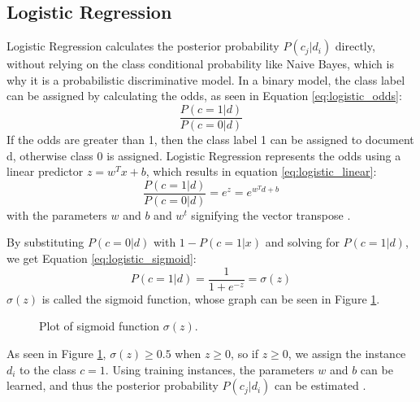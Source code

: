 \subsection{Logistic Regression}
Logistic Regression calculates the posterior probability $P(c_j|d_i)$ directly, without relying on the class conditional probability like Naive Bayes, which is why it is a probabilistic discriminative model. In a binary model, the class label can be assigned by calculating the odds, as seen in Equation \eqref{eq:logistic_odds}:
        \begin{equation}
            \label{eq:logistic_odds}
                \frac{P(c=1|d)}{P(c=0|d)}
        \end{equation}
If the odds are greater than 1, then the class label 1 can be assigned to document d, otherwise class 0 is assigned. Logistic Regression represents the odds using a linear predictor $z=w^Tx + b$, which results in equation \eqref{eq:logistic_linear}:
        \begin{equation}
            \label{eq:logistic_linear}
                \frac{P(c=1|d)}{P(c=0|d)} = e^z = e^{w^Td+b}
        \end{equation}
with the parameters $w$ and $b$ and $w^t$ signifying the vector transpose \cite{DBLP:books/aw/TanSKK2019}.

By substituting $P(c=0|d)$ with $1 - P(c=1|x)$ and solving for $P(c=1|d)$, we get Equation \eqref{eq:logistic_sigmoid}:
        {\begin{equation}
            \label{eq:logistic_sigmoid}
                P(c=1|d) = \frac{1}{1+e^{-z}} = \sigma(z)
        \end{equation}}
$\sigma(z)$ is called the sigmoid function, whose graph can be seen in Figure \ref{fig:sigmoid}.
        \begin{figure}[h!]
        \centering

    \caption{Plot of sigmoid function $\sigma(z)$.}
      \label{fig:sigmoid}
\end{figure}
As seen in Figure \ref{fig:sigmoid}, $\sigma(z) \geq 0.5$ when $z \geq 0$, so if $z \geq 0$, we assign the instance $d_i$ to the class $c = 1$. Using training instances, the parameters $w$ and $b$ can be learned, and thus the posterior probability $P(c_j|d_i)$ can be estimated \cite{DBLP:books/aw/TanSKK2019}.

